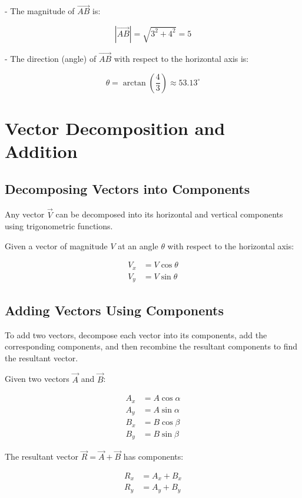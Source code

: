 \documentclass{article}
\begin{document}
\begin{multicols}{2}
- The magnitude of $ \vec{AB} $ is:

  \[
  |\vec{AB}| = \sqrt{3^2 + 4^2} = 5
  \]

- The direction (angle) of $ \vec{AB} $ with respect to the horizontal axis is:

  \[
  \theta = \arctan\left( \frac{4}{3} \right) \approx 53.13^\circ
  \]

\section*{Vector Decomposition and Addition}

\subsection*{Decomposing Vectors into Components}

Any vector $ \vec{V} $ can be decomposed into its horizontal and vertical components using trigonometric functions.

Given a vector of magnitude $ V $ at an angle $ \theta $ with respect to the horizontal axis:

\[
\begin{aligned}
V_x &= V \cos \theta \\
V_y &= V \sin \theta
\end{aligned}
\]

\subsection*{Adding Vectors Using Components}

To add two vectors, decompose each vector into its components, add the corresponding components, and then recombine the resultant components to find the resultant vector.

Given two vectors $ \vec{A} $ and $ \vec{B} $:

\[
\begin{aligned}
A_x &= A \cos \alpha \\
A_y &= A \sin \alpha \\
B_x &= B \cos \beta \\
B_y &= B \sin \beta
\end{aligned}
\]

The resultant vector $ \vec{R} = \vec{A} + \vec{B} $ has components:

\[
\begin{aligned}
R_x &= A_x + B_x \\
R_y &= A_y + B_y
\end{aligned}
\]


\end{multicols}
\end{document}
